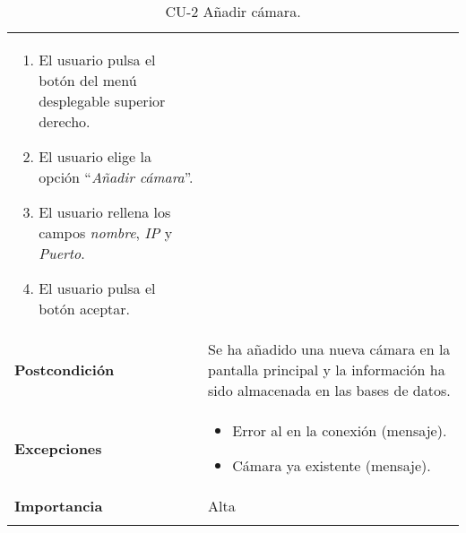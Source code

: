 \begin{longtable}[h!]{@{}ll@{}}
\begin{minipage}[t]{0.71\columnwidth}
\begin{enumerate}
\def\labelenumi{\arabic{enumi}.}
\tightlist
\item
  El usuario pulsa el botón del menú desplegable superior derecho.
\item
  El usuario elige la opción ``\textit{Añadir cámara}''.
\item
  El usuario rellena los campos \textit{nombre}, \textit{IP} y \textit{Puerto}.
\item
  El usuario pulsa el botón aceptar.
\end{enumerate}\strut
\end{minipage}\tabularnewline
\begin{minipage}[t]{0.23\columnwidth}\raggedright\strut
\textbf{Postcondición}\strut
\end{minipage} & \begin{minipage}[t]{0.71\columnwidth}\raggedright\strut
Se ha añadido una nueva cámara en la pantalla principal y la información ha sido almacenada en las bases de datos.\strut
\end{minipage}\tabularnewline
\begin{minipage}[t]{0.23\columnwidth}\raggedright\strut
\textbf{Excepciones}\strut
\end{minipage} & \begin{minipage}[t]{0.71\columnwidth}\raggedright\strut
\begin{itemize}
\tightlist
\item
  Error al en la conexión (mensaje).
\item
  Cámara ya existente (mensaje).
\end{itemize}\strut
\end{minipage}\tabularnewline
\begin{minipage}[t]{0.23\columnwidth}\raggedright\strut
\textbf{Importancia}\strut
\end{minipage} & \begin{minipage}[t]{0.71\columnwidth}\raggedright\strut
Alta\strut
\end{minipage}\tabularnewline
\bottomrule
\caption{CU-2 Añadir cámara.}
\end{longtable}


